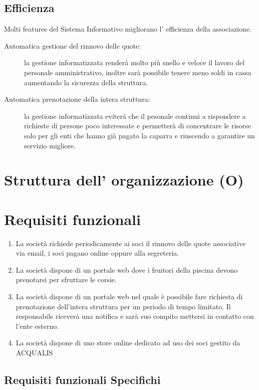 \documentclass[11pt]{article} %
\begin{document}
\subsection{Efficienza}

Molti features del Sistema Informativo migliorano l' efficienza della associazione.

\begin{description}
	\item[Automatica gestione del rinnovo delle quote:] la gestione informatizzata renderà molto più snello e veloce il lavoro del personale amministrativo, inoltre sarà possibile tenere meno soldi in cassa aumentando la sicurezza della struttura. 
	\item[Automatica prenotazione della intera struttura:] la gestione informatizzata eviterà che il pesonale continui a rispondere a richieste di persone poco interessate e permetterà di concentrare le risorse solo per gli enti che hanno già pagato la caparra e riuscendo a garantire un servizio migliore.
\end{description}

\section{Struttura dell' organizzazione (O)}

\section{Requisiti funzionali}

\begin{enumerate}
	\item La società richiede periodicamente ai soci il rinnovo delle quote associative via email, i soci pagano online oppure alla segreteria.
	\item La società dispone di un portale web dove i fruitori della piscina devono prenotarsi per sfruttare le corsie.
	\item La società dispone di un portale web nel quale è possibile fare richiesta di prenotazione dell'intera struttura per un periodo di tempo limitato. Il responsabile riceverà una notifica e sarà suo compito mettersi in contatto con l'ente esterno.
	\item La società dispone di uno store online dedicato ad uso dei soci gestito da ACQUALIS
\end{enumerate}

\subsection{Requisiti funzionali Specifichi}
\end{document}
